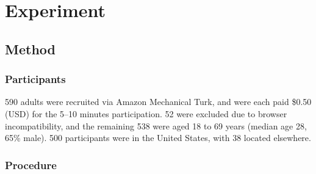 \documentclass[doc,12pt]{apa}
\newcommand{\relevant}{\textsc{Both Relevant}}
\newcommand{\relevantdata}{\textsc{Relevant Fillers}}
\newcommand{\randomdata}{\textsc{Random Fillers}}
\newcommand{\random}{\textsc{Both Random}}
\begin{document}
\section{Experiment}


\subsection{Method}

\subsubsection{Participants}


590 adults were recruited via Amazon Mechanical Turk, and were each paid \$0.50 (USD) for the 5--10 minutes participation. 52 were excluded due to
browser incompatibility, and the remaining 538 were aged 18 to
69 years (median age 28, 65\% male).
500 participants were in the United States, with 38 located elsewhere.

\subsubsection{Procedure}
\end{document}
